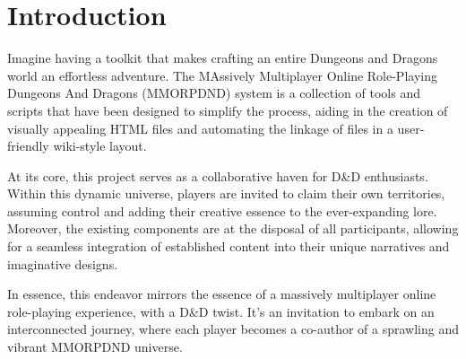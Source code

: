 \chapter{Introduction}

Imagine having a toolkit that makes crafting an entire Dungeons and Dragons world an effortless adventure. The MAssively Multiplayer Online Role-Playing Dungeons And Dragons (MMORPDND) system is a collection of tools and scripts that have been designed to simplify the process, aiding in the creation of visually appealing HTML files and automating the linkage of files in a user-friendly wiki-style layout.

At its core, this project serves as a collaborative haven for D\&D enthusiasts. Within this dynamic universe, players are invited to claim their own territories, assuming control and adding their creative essence to the ever-expanding lore. Moreover, the existing components are at the disposal of all participants, allowing for a seamless integration of established content into their unique narratives and imaginative designs.

In essence, this endeavor mirrors the essence of a massively multiplayer online role-playing experience, with a D\&D twist. It's an invitation to embark on an interconnected journey, where each player becomes a co-author of a sprawling and vibrant MMORPDND universe.
